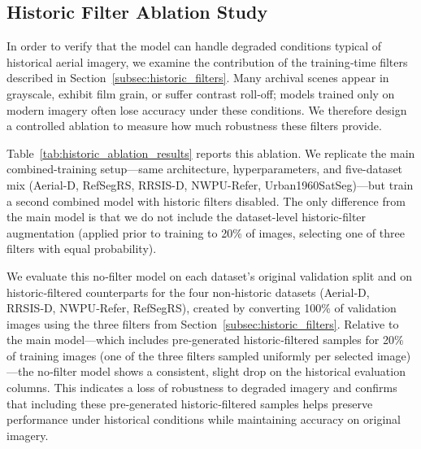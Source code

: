 \subsection{Historic Filter Ablation Study}
\label{subsec:historic_ablation}

In order to verify that the model can handle degraded conditions typical of historical aerial imagery, we examine the contribution of the training‑time filters described in Section~\ref{subsec:historic_filters}. Many archival scenes appear in grayscale, exhibit film grain, or suffer contrast roll‑off; models trained only on modern imagery often lose accuracy under these conditions. We therefore design a controlled ablation to measure how much robustness these filters provide.

Table~\ref{tab:historic_ablation_results} reports this ablation. We replicate the main combined-training setup—same architecture, hyperparameters, and five-dataset mix (Aerial-D, RefSegRS, RRSIS-D, NWPU-Refer, Urban1960SatSeg)—but train a second combined model with historic filters disabled. The only difference from the main model is that we do not include the dataset-level historic-filter augmentation (applied prior to training to 20\% of images, selecting one of three filters with equal probability).

We evaluate this no‑filter model on each dataset’s original validation split and on historic‑filtered counterparts for the four non‑historic datasets (Aerial‑D, RRSIS‑D, NWPU‑Refer, RefSegRS), created by converting 100\% of validation images using the three filters from Section~\ref{subsec:historic_filters}. Relative to the main model—which includes pre‑generated historic‑filtered samples for 20\% of training images (one of the three filters sampled uniformly per selected image)—the no‑filter model shows a consistent, slight drop on the historical evaluation columns. This indicates a loss of robustness to degraded imagery and confirms that including these pre‑generated historic‑filtered samples helps preserve performance under historical conditions while maintaining accuracy on original imagery.

